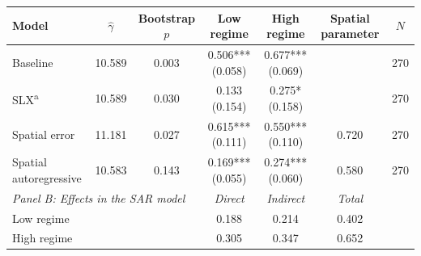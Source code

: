 \begin{tabular}{lcccccc}
\toprule
Model & $\hat{\gamma}$ & Bootstrap $p$ & Low regime & High regime & Spatial parameter & $N$ \\
\midrule
Baseline & 10.589 & 0.003 & 0.506*** (0.058) & 0.677*** (0.069) &  & 270 \\
SLX\textsuperscript{a} & 10.589 & 0.030 & 0.133 (0.154) & 0.275* (0.158) &  & 270 \\
Spatial error & 11.181 & 0.027 & 0.615*** (0.111) & 0.550*** (0.110) & 0.720 & 270 \\
Spatial autoregressive & 10.583 & 0.143 & 0.169*** (0.055) & 0.274*** (0.060) & 0.580 & 270 \\
\midrule
\multicolumn{3}{l}{\textit{Panel B: Effects in the SAR model}} & \textit{Direct} & \textit{Indirect} & \textit{Total} & \\
\midrule
Low regime & & & 0.188 & 0.214 & 0.402 & \\
High regime & & & 0.305 & 0.347 & 0.652 & \\
\bottomrule
\end{tabular}